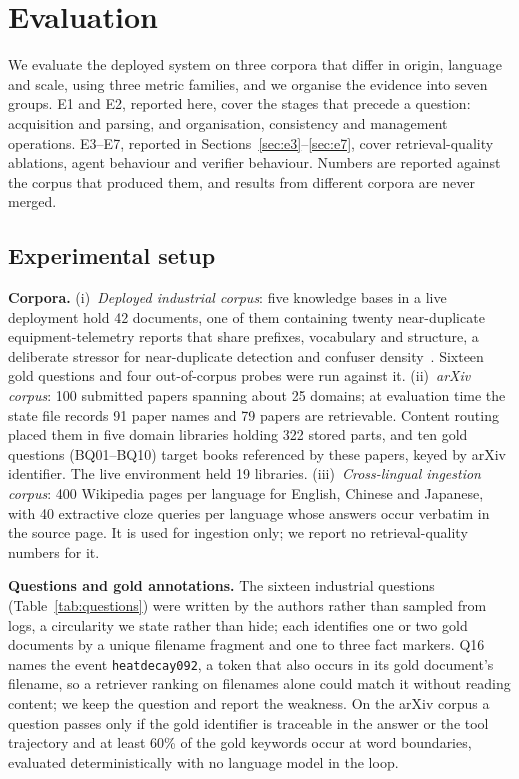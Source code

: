 \section{Evaluation}
\label{sec:eval}

We evaluate the deployed system on three corpora that differ in origin, language and scale, using three metric families, and we organise the evidence into seven groups. E1 and E2, reported here, cover the stages that precede a question: acquisition and parsing, and organisation, consistency and management operations. E3--E7, reported in Sections~\ref{sec:e3}--\ref{sec:e7}, cover retrieval-quality ablations, agent behaviour and verifier behaviour. Numbers are reported against the corpus that produced them, and results from different corpora are never merged.

\subsection{Experimental setup}
\label{sec:eval-setup}

\textbf{Corpora.} (i)~\emph{Deployed industrial corpus}: five knowledge bases in a live deployment hold 42 documents, one of them containing twenty near-duplicate equipment-telemetry reports that share prefixes, vocabulary and structure, a deliberate stressor for near-duplicate detection and confuser density~\cite{manku-near-dup-2007}. Sixteen gold questions and four out-of-corpus probes were run against it. (ii)~\emph{arXiv corpus}: 100 submitted papers spanning about 25 domains; at evaluation time the state file records 91 paper names and 79 papers are retrievable. Content routing placed them in five domain libraries holding 322 stored parts, and ten gold questions (BQ01--BQ10) target books referenced by these papers, keyed by arXiv identifier. The live environment held 19 libraries. (iii)~\emph{Cross-lingual ingestion corpus}: 400 Wikipedia pages per language for English, Chinese and Japanese, with 40 extractive cloze queries per language whose answers occur verbatim in the source page. It is used for ingestion only; we report no retrieval-quality numbers for it.

\textbf{Questions and gold annotations.} The sixteen industrial questions (Table~\ref{tab:questions}) were written by the authors rather than sampled from logs, a circularity we state rather than hide; each identifies one or two gold documents by a unique filename fragment and one to three fact markers. Q16 names the event \texttt{heatdecay092}, a token that also occurs in its gold document's filename, so a retriever ranking on filenames alone could match it without reading content; we keep the question and report the weakness. On the arXiv corpus a question passes only if the gold identifier is traceable in the answer or the tool trajectory and at least 60\% of the gold keywords occur at word boundaries, evaluated deterministically with no language model in the loop.

